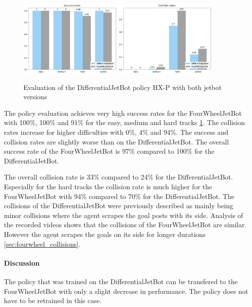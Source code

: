 \begin{figure}
    \centering
    \includegraphics[width=0.45\textwidth]{Bilder/notebook_images/hardDistanceMixedLight_eval_jetbot_generalization_success_rates_barplot.png}
    \includegraphics[width=0.45\textwidth]{Bilder/notebook_images/hardDistanceMixedLight_eval_jetbot_generalization_collision_rates_barplot.png}
    \caption{Evaluation of the DifferentialJetBot policy \ac{HX-P} with both jetbot versions}
    \label{fig:result_jetbot_generalization}
\end{figure} %

The policy evaluation achieves very high success rates for the FourWheelJetBot with 100\%, 100\% and 91\% for the easy, medium and hard tracks \ref{fig:result_jetbot_generalization}. The collision rates increase for higher difficulties with 0\%, 4\% and 94\%. 
The success and collision rates are slightly worse than on the DifferentialJetBot. The overall success rate of the FourWheelJetBot is 97\% compared to 100\% for the DifferentialJetBot. 

The overall collision rate is 33\% compared to 24\% for the DifferentialJetBot. Especially for the hard tracks the collision rate is much higher for the FourWheelJetBot with 94\% compared to 70\% for the DifferentialJetBot.
The collisions of the DifferentialJetBot were previously described as mainly being minor collisions where the agent scrapes the goal posts with its side. Analysis of the recorded videos shows that the collisions of the FourWheelJetBot are similar. However the agent scrapes the goals on its side for longer durations \ref{sec:fourwheel_collisions}.


\paragraph{Discussion}

The policy that was trained on the DifferentialJetBot can be transfered to the FourWheelJetBot with only a slight decrease in performance.
The policy does not have to be retrained in this case. 

